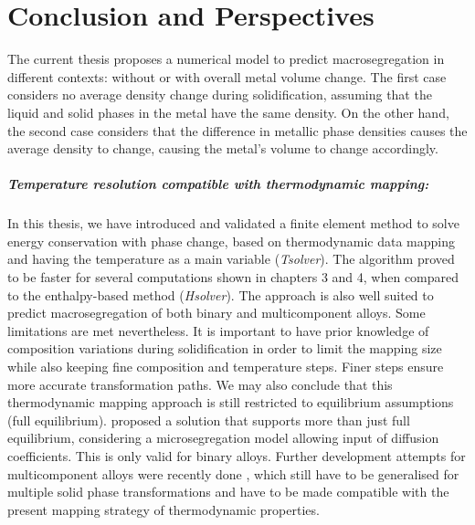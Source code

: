 \chapter*{Conclusion and Perspectives}


The current thesis proposes a numerical model to predict macrosegregation in different contexts: without or
with overall metal volume change. The first case considers no average density change during solidification, 
assuming that the liquid and solid phases in the metal have the same density. 
On the other hand, the second case considers that the difference in metallic 
phase densities causes the average density to change, causing the metal's volume to
change accordingly. 

\paragraph{Temperature resolution compatible with thermodynamic mapping:}
In this thesis, we have introduced and validated a finite element method to solve energy conservation with phase change, based 
on thermodynamic data mapping and having the temperature as a main variable (\emph{Tsolver}). The algorithm proved to be faster for several computations
shown in chapters 3 and 4, when compared to the enthalpy-based method (\emph{Hsolver}). The approach is also well suited to predict macrosegregation
of both binary and multicomponent alloys. Some limitations are met nevertheless. It is important to have prior knowledge of composition variations
during solidification in order to limit the mapping size while also keeping fine composition and temperature steps.
Finer steps ensure more accurate transformation paths. We may also conclude that this thermodynamic mapping approach is still
restricted to equilibrium assumptions (full equilibrium). \citet{tourret_multiple_2011} proposed
a solution that supports more than just full equilibrium, considering a microsegregation model allowing input of diffusion coefficients.
This is only valid for binary alloys. Further development attempts for multicomponent alloys were recently done \citep{guillemot_analytical_2015}, which
still have to be generalised for multiple solid phase transformations and have to be made compatible with the present mapping strategy of thermodynamic
properties.

